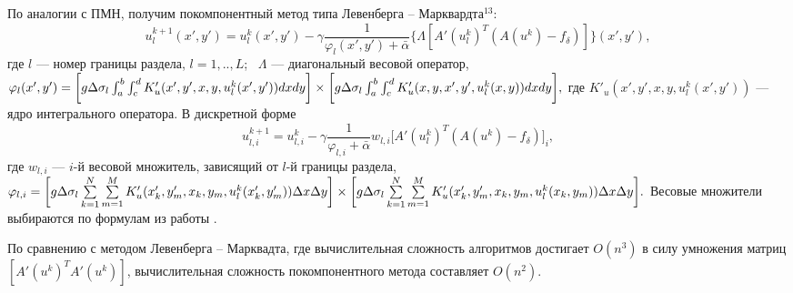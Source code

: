 \documentclass[%
autoref,     %
href,        %
colorlinks,  %
]{disser}
\begin{document}
По аналогии с ПМН, получим покомпонентный метод типа Левенберга -- Марквардта$^{13}$:
$$ u_l^{k+1}(x',y')=u_l^k(x',y')-\gamma\frac{1}{\varphi_l(x',y')+\bar{\alpha}}\big\{\Lambda[ A'(u_l^k)^T(A(u^k)-f_\delta)]\big\}(x',y'),$$
где $l$ --- номер границы раздела, $l=1,..,L$;~ $\Lambda$ --- диагональный весовой оператор, 
$\varphi_l(x',y')=\bigg[ g\Delta\sigma_l\int_{a}^{b}\int_{c}^{d}
K'_u(x', y', x, y, u_l^k(x',y'))dxdy\bigg] \notag \\ \times\bigg[g\Delta\sigma_l\int_{a}^{b}\int_{c}^{d}K'_u(x,y, x',y',u_l^k(x,y))dxdy\bigg], $
где $K'_u(x',y', x, y, u_l^k(x',y'))$ --- ядро интегрального оператора.
{\scriptsize
\let\thefootnote\relax\let\thefootnote\relax{}}
В дискретной форме
\begin{equation*}\label{comp_lm_meth_disc}
u_{l,i}^{k+1}=u_{l,i}^k-\gamma\frac{1}{\varphi_{l,i}+\bar{\alpha}}w_{l,i}\big[ A'(u_l^k)^T(A(u^k)-f_\delta)\big]_i,
\end{equation*}
где $w_{l,i}$ --- $i$-й весовой множитель, зависящий от $l$-й границы раздела,\\
$
\varphi_{l,i}=\bigg[ g\Delta\sigma_l\sum\limits_{k=1}^{N}
\sum\limits_{m=1}^{M}
K'_u(x'_k,y'_m, x_k, y_m, u_l^k(x'_k,y'_m)) \Delta x \Delta y\bigg] \notag \\ \times\bigg[g\Delta\sigma_l\sum\limits_{k=1}^{N}
\sum\limits_{m=1}^{M}K'_u(x'_k, y'_m, x_k,y_m, u_l^k(x_k,y_m))\Delta x \Delta y\bigg]. \\
$
Весовые множители выбираются по формулам из работы \cite{AkMisSkurTre2015_2}. 

По сравнению с методом Левенберга -- Марквадта, где вычислительная сложность алгоритмов достигает $O(n^3)$ в силу умножения матриц $[A'(u^k)^T A'(u^k)]$, вычислительная сложность покомпонентного метода составляет $O(n^2)$.
\end{document}
